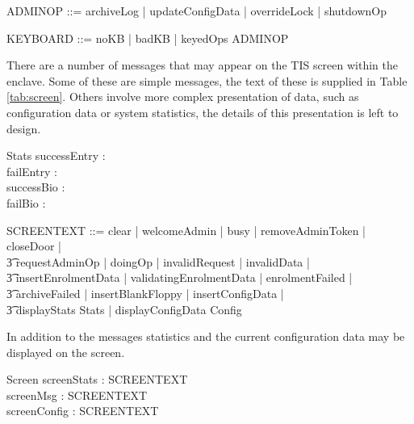 \begin{zed}
        ADMINOP ::=  archiveLog | updateConfigData |
        overrideLock | shutdownOp 
\end{zed}  %

\begin{zed}
        KEYBOARD ::= noKB | badKB | keyedOps \ldata ADMINOP \rdata 
\end{zed}

There are a number of messages that may appear on the TIS screen
within the enclave. Some of these are simple messages, the text of these
is supplied in Table \ref{tab:screen}. 
Others involve more complex presentation of data, such as
configuration data or system statistics, the details of this
presentation is left to design.


\begin{schema}{Stats} 
        successEntry : \nat
\\      failEntry : \nat
\\      successBio : \nat
\\      failBio : \nat
\end{schema} %
\begin{zed}
       SCREENTEXT ::= clear | welcomeAdmin | busy | removeAdminToken |
       closeDoor |
\\ \t3          requestAdminOp | doingOp | invalidRequest | invalidData |
\\ \t3          insertEnrolmentData | validatingEnrolmentData |
       enrolmentFailed |
\\ \t3          archiveFailed | insertBlankFloppy | insertConfigData |
\\ 
        \t3  displayStats \ldata Stats \rdata | 
        displayConfigData \ldata Config \rdata
\end{zed}

In addition to the messages statistics and the current configuration
data may be displayed on the screen.

\begin{schema}{Screen}
        screenStats : SCREENTEXT
\\      screenMsg : SCREENTEXT
\\      screenConfig : SCREENTEXT 
\end{schema}

